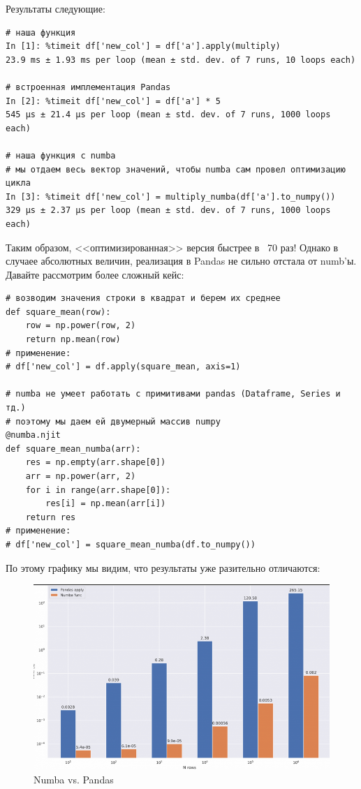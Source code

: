 \documentclass{article}
\begin{document}
Результаты следующие:
\begin{verbatim}
# наша функция
In [1]: %timeit df['new_col'] = df['a'].apply(multiply)
23.9 ms ± 1.93 ms per loop (mean ± std. dev. of 7 runs, 10 loops each)

# встроенная имплементация Pandas
In [2]: %timeit df['new_col'] = df['a'] * 5
545 µs ± 21.4 µs per loop (mean ± std. dev. of 7 runs, 1000 loops each)

# наша функция с numba
# мы отдаем весь вектор значений, чтобы numba сам провел оптимизацию цикла
In [3]: %timeit df['new_col'] = multiply_numba(df['a'].to_numpy())
329 µs ± 2.37 µs per loop (mean ± std. dev. of 7 runs, 1000 loops each)
\end{verbatim}

Таким образом, <<оптимизированная>> версия быстрее в ~70 раз! Однако в случаее абсолютных величин, реализация в Pandas не сильно отстала от numb'ы. Давайте рассмотрим более сложный кейс:
\begin{verbatim}
# возводим значения строки в квадрат и берем их среднее 
def square_mean(row):
    row = np.power(row, 2)
    return np.mean(row)
# применение:
# df['new_col'] = df.apply(square_mean, axis=1)

# numba не умеет работать с примитивами pandas (Dataframe, Series и тд.)
# поэтому мы даем ей двумерный массив numpy
@numba.njit
def square_mean_numba(arr):
    res = np.empty(arr.shape[0])
    arr = np.power(arr, 2)
    for i in range(arr.shape[0]):
        res[i] = np.mean(arr[i])
    return res
# применение:
# df['new_col'] = square_mean_numba(df.to_numpy())
\end{verbatim}

По этому графику мы видим, что результаты уже разительно отличаются:
\begin{figure}[H]
    \centering
    \includegraphics[width=0.75\linewidth]{pandas_numba.png}
    \caption{Numba vs. Pandas}
\end{figure}
\end{document}
